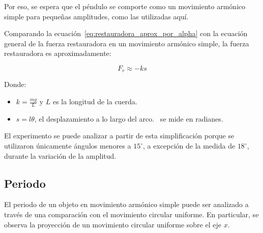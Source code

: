 \documentclass[letterpaper]{report}
\numberwithin{table}{section}
\begin{document}
Por eso, se espera que el péndulo se comporte como un movimiento
armónico simple para pequeñas amplitudes, como las utilizadas aquí.

Comparando la ecuación~\eqref{eq:restauradora_aprox_por_alpha} con la
ecuación general de la fuerza restauradora en un movimiento armónico
simple, la fuerza restauradora es aproximadamente:

\begin{equation}\label{eq:restauradora_mas}
  F_{r} \approx -ks
\end{equation}

Donde:

\begin{itemize}
  \item $k = \frac{mg}{L}$ y $L$ es la longitud de la cuerda.
  \item $s = l\theta$, el desplazamiento a lo largo del
    arco.\ \theta{} se mide en radianes.
\end{itemize}

El experimento se puede analizar a partir de esta simplificación
porque se utilizaron únicamente ángulos menores a $15^{\circ}$, a
excepción de la medida de $18^{\circ}$, durante la variación de la amplitud.

\subsection{Periodo}

El periodo de un objeto en movimiento armónico simple puede ser
analizado a través de una comparación con el movimiento circular
uniforme. En particular, se observa la proyección de un movimiento
circular uniforme sobre el eje $x$.
\end{document}
